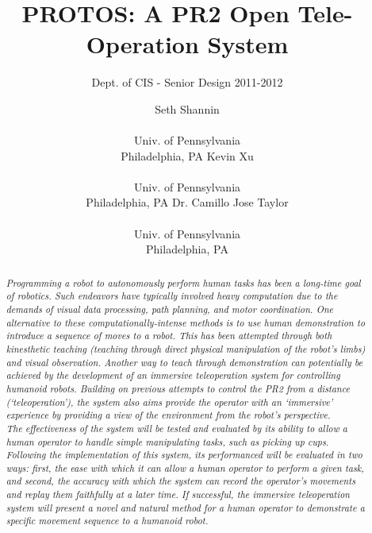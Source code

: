 \documentclass{sig-alternate}
\begin{document}
 

\title{PROTOS: A PR2 Open Tele-Operation System}

\subtitle{Dept. of CIS - Senior Design 2011-2012}
\author{
\alignauthor Seth Shannin \\  \\ Univ. of Pennsylvania \\ Philadelphia, PA
\alignauthor Kevin Xu \\  \\ Univ. of Pennsylvania \\ Philadelphia, PA
\alignauthor Dr. Camillo Jose Taylor \\  \\ Univ. of Pennsylvania \\ Philadelphia, PA}
\date{}
\maketitle

\begin{abstract}
\textit{\indent Programming a robot to autonomously perform human tasks has been a 
long-time goal of robotics. Such endeavors have typically involved heavy 
computation due to the demands of visual data processing, path planning, and motor 
coordination. One alternative to these computationally-intense methods is to use 
human demonstration to introduce a sequence 
of moves to a robot. This has been attempted
through both kinesthetic teaching (teaching through direct physical 
manipulation of the robot's limbs) and visual observation. Another way to teach through demonstration
can potentially be achieved by the development of an immersive
teleoperation system for controlling humanoid robots. Building on previous attempts to
control the PR2 from a distance (`teleoperation'), the system also aims provide the
operator with an `immersive' experience by providing a view of 
the environment from the robot's perspective. \\
\indent The effectiveness of the system will be tested and evaluated by its ability to allow a human operator
to handle simple manipulating tasks, such as picking up cups.
Following the implementation of this system, its performanced will be evaluated in two ways: first, the ease with which
it can allow a human operator to perform a given task, and second, the accuracy with which the system can record
the operator's movements and replay them faithfully at a later time.
If successful, the immersive teleoperation system will present a novel and natural method for a
human operator to demonstrate a specific movement sequence to a humanoid robot.}
\end{abstract}
\end{document}
